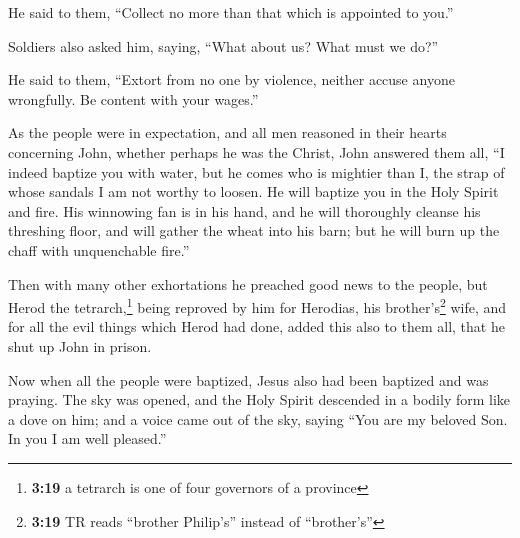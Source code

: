  He said to them, ``Collect no more than that which is
appointed to you.''

 Soldiers also asked him, saying, ``What about us? What
must we do?''

He said to them, ``Extort from no one by violence, neither accuse anyone
wrongfully. Be content with your wages.''

 As the people were in expectation, and all men reasoned
in their hearts concerning John, whether perhaps he was the Christ,
 John answered them all, ``I indeed baptize you with
water, but he comes who is mightier than I, the strap of whose sandals I
am not worthy to loosen. He will baptize you in the Holy Spirit and
fire.  His winnowing fan is in his hand, and he will
thoroughly cleanse his threshing floor, and will gather the wheat into
his barn; but he will burn up the chaff with unquenchable fire.''

 Then with many other exhortations he preached good news
to the people,  but Herod the tetrarch,\footnote{\textbf{3:19}
  a tetrarch is one of four governors of a province} being reproved by
him for Herodias, his brother's\footnote{\textbf{3:19} TR reads
  ``brother Philip's'' instead of ``brother's''} wife, and for all the
evil things which Herod had done,  added this also to
them all, that he shut up John in prison.

 Now when all the people were baptized, Jesus also had
been baptized and was praying. The sky was opened,  and
the Holy Spirit descended in a bodily form like a dove on him; and a
voice came out of the sky, saying ``You are my beloved Son. In you I am
well pleased.''

